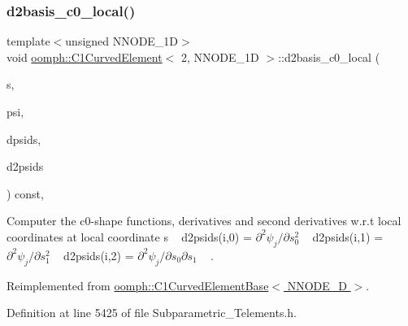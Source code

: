 \subsubsection{\texorpdfstring{d2basis\+\_\+c0\+\_\+local()}{d2basis\_c0\_local()}}
{\footnotesize\ttfamily template$<$unsigned N\+N\+O\+D\+E\+\_\+1D$>$ \\
void \hyperlink{classoomph_1_1C1CurvedElement}{oomph\+::\+C1\+Curved\+Element}$<$ 2, N\+N\+O\+D\+E\+\_\+1D $>$\+::d2basis\+\_\+c0\+\_\+local (\begin{DoxyParamCaption}\item[{const \hyperlink{classoomph_1_1Vector}{Vector}$<$ double $>$ \&}]{s,  }\item[{\hyperlink{classoomph_1_1Shape}{Shape} \&}]{psi,  }\item[{\hyperlink{classoomph_1_1DShape}{D\+Shape} \&}]{dpsids,  }\item[{\hyperlink{classoomph_1_1DShape}{D\+Shape} \&}]{d2psids }\end{DoxyParamCaption}) const\hspace{0.3cm}{\ttfamily [inline]}, {\ttfamily [virtual]}}



Computer the c0-\/shape functions, derivatives and second derivatives w.\+r.\+t local coordinates at local coordinate s ~\newline
d2psids(i,0) = $ \partial^2 \psi_j / \partial s_0^2 $ ~\newline
d2psids(i,1) = $ \partial^2 \psi_j / \partial s_1^2 $ ~\newline
d2psids(i,2) = $ \partial^2 \psi_j / \partial s_0 \partial s_1 $ ~\newline
. 



Reimplemented from \hyperlink{classoomph_1_1C1CurvedElementBase_a72e258f980ba1f790e1ba0bc4ec6ef0a}{oomph\+::\+C1\+Curved\+Element\+Base$<$ N\+N\+O\+D\+E\+\_\+D $>$}.



Definition at line 5425 of file Subparametric\+\_\+\+Telements.\+h.

\mbox{\label{classoomph_1_1C1CurvedElement_3_012_00_01NNODE__1D_01_4_aa0473d19ec3717e1628e85206497bb75}} 
